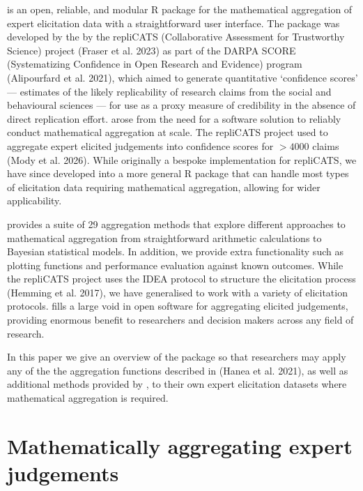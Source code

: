 \documentclass[
  11pt,
  a4paper,
]{article}
\begin{document}
 is an open, reliable, and modular R package for the
mathematical aggregation of expert elicitation data with a
straightforward user interface. The  package was developed
by the by the repliCATS (Collaborative Assessment for Trustworthy
Science) project (Fraser et al. 2023) as part of the DARPA SCORE
(Systematizing Confidence in Open Research and Evidence) program
(Alipourfard et al. 2021), which aimed to generate quantitative
`confidence scores' --- estimates of the likely replicability of
research claims from the social and behavioural sciences --- for use as
a proxy measure of credibility in the absence of direct replication
effort.  arose from the need for a software solution to
reliably conduct mathematical aggregation at scale. The repliCATS
project used  to aggregate expert elicited judgements into
confidence scores for \(> 4000\) claims (Mody et al. 2026). While
originally a bespoke implementation for repliCATS, we have since
developed  into a more general R package that can handle
most types of elicitation data requiring mathematical aggregation,
allowing for wider applicability.

 provides a suite of 29 aggregation methods that explore
different approaches to mathematical aggregation from straightforward
arithmetic calculations to Bayesian statistical models. In addition, we
provide extra functionality such as plotting functions and performance
evaluation against known outcomes. While the repliCATS project uses the
IDEA protocol to structure the elicitation process (Hemming et al.
2017), we have generalised  to work with a variety of
elicitation protocols.  fills a large void in open
software for aggregating elicited judgements, providing enormous benefit
to researchers and decision makers across any field of research.

In this paper we give an overview of the  package so that
researchers may apply any of the the aggregation functions described in
({Hanea et al.} 2021), as well as additional methods provided by
, to their own expert elicitation datasets where
mathematical aggregation is required.

\section{Mathematically aggregating expert
judgements}\label{mathematically-aggregating-expert-judgements}
\end{document}
